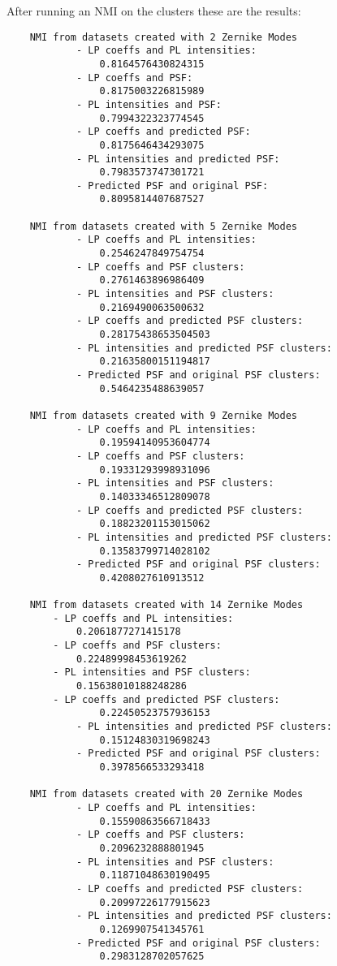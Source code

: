 		After running an NMI on the clusters these are the results:
		\begin{lstlisting}
	NMI from datasets created with 2 Zernike Modes
    		- LP coeffs and PL intensities:
    			0.8164576430824315
    		- LP coeffs and PSF: 
    			0.8175003226815989
    		- PL intensities and PSF:
    			0.7994322323774545
    		- LP coeffs and predicted PSF: 
    			0.8175646434293075
    		- PL intensities and predicted PSF: 
    			0.7983573747301721
    		- Predicted PSF and original PSF: 
    			0.8095814407687527
    				
	NMI from datasets created with 5 Zernike Modes
    		- LP coeffs and PL intensities: 
    			0.2546247849754754
    		- LP coeffs and PSF clusters: 
    			0.2761463896986409
    		- PL intensities and PSF clusters:
    			0.2169490063500632
    		- LP coeffs and predicted PSF clusters: 
    			0.28175438653504503
    		- PL intensities and predicted PSF clusters: 
    			0.21635800151194817
    		- Predicted PSF and original PSF clusters: 
    			0.5464235488639057

	NMI from datasets created with 9 Zernike Modes
    		- LP coeffs and PL intensities: 
    			0.19594140953604774
    		- LP coeffs and PSF clusters: 
    			0.19331293998931096
    		- PL intensities and PSF clusters: 
    			0.14033346512809078
    		- LP coeffs and predicted PSF clusters: 
    			0.18823201153015062
    		- PL intensities and predicted PSF clusters: 
    			0.13583799714028102
    		- Predicted PSF and original PSF clusters: 
    			0.4208027610913512

	NMI from datasets created with 14 Zernike Modes
		- LP coeffs and PL intensities: 
			0.2061877271415178
		- LP coeffs and PSF clusters: 
			0.22489998453619262
   		- PL intensities and PSF clusters: 
   			0.15638010188248286
   		- LP coeffs and predicted PSF clusters: 
    			0.22450523757936153
    		- PL intensities and predicted PSF clusters: 
    			0.15124830319698243
    		- Predicted PSF and original PSF clusters: 
    			0.3978566533293418

	NMI from datasets created with 20 Zernike Modes
    		- LP coeffs and PL intensities:
    			0.15590863566718433
    		- LP coeffs and PSF clusters: 
    			0.2096232888801945
    		- PL intensities and PSF clusters: 
    			0.11871048630190495
    		- LP coeffs and predicted PSF clusters: 
    			0.20997226177915623
    		- PL intensities and predicted PSF clusters: 
    			0.1269907541345761
    		- Predicted PSF and original PSF clusters: 
    			0.2983128702057625
	\end{lstlisting}
	
